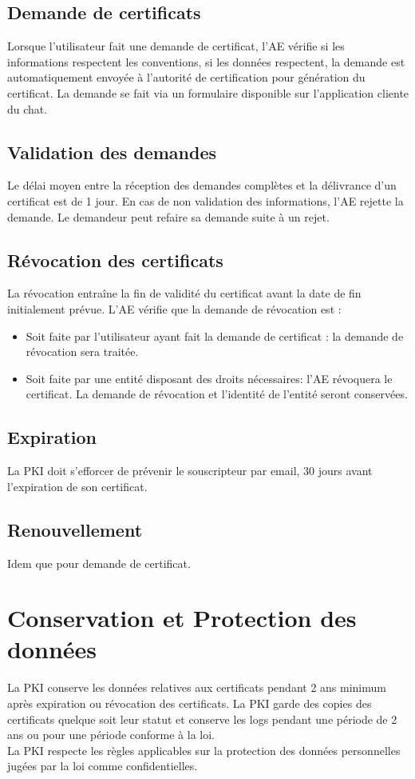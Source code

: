 \documentclass[a4paper,11pt,french]{article}
\begin{document}
\subsection{Demande de certificats}
Lorsque l'utilisateur fait une demande de certificat, l’AE vérifie si les informations respectent les conventions, si les données
respectent, la demande est automatiquement envoyée à l'autorité de certification pour génération du certificat. La demande se fait via un formulaire disponible sur l'application cliente du chat.

\subsection{Validation  des demandes}
Le délai moyen entre la réception des demandes complètes et la délivrance d'un certificat est de 1 jour. En cas de non validation des informations, l’AE rejette la demande. Le demandeur peut refaire sa demande suite à un rejet.

\subsection{Révocation des certificats}
La révocation entraîne la fin de validité du certificat avant la date de fin initialement prévue. L’AE vérifie que la demande de révocation est :
\begin{itemize}
\item Soit faite par l'utilisateur ayant fait la demande de certificat :  la demande de révocation sera traitée.
\item Soit faite par une entité disposant des droits nécessaires: l'AE révoquera le certificat. La demande de révocation et l'identité de l'entité seront conservées.
\end{itemize}

\subsection{Expiration}
La PKI doit s'efforcer de prévenir le souscripteur par email, 30 jours avant l'expiration de son certificat.

\subsection{Renouvellement}
Idem que pour demande de certificat.

\section{Conservation et Protection des données}
La PKI conserve les données relatives aux certificats pendant 2 ans minimum après expiration ou révocation des certificats. La PKI garde des copies des certificats quelque soit leur statut et conserve les logs pendant une période de 2 ans ou pour une période conforme à la loi. 
\\La PKI respecte les règles applicables sur la protection des données personnelles jugées par la loi comme confidentielles.
\end{document}
